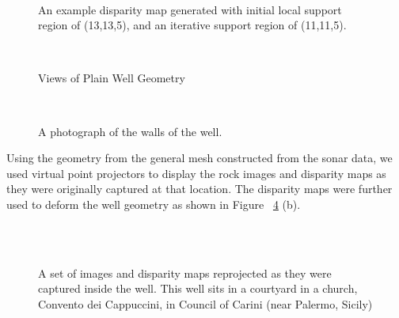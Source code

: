 \documentclass[a4paper,twoside]{article}
\begin{document}
\begin{figure}[!h]
	\centering
		\quad %
		\\%
		\medskip
		\caption{An example disparity map generated with initial local support region of (13,13,5), and an iterative support region of (11,11,5).}
		\label{fig:disparity}
\end{figure}


\begin{figure}[!h]
	\centering
		\quad %
		\\%

		\caption{Views of Plain Well Geometry}
		\label{fig:wellNoFine}
\end{figure}

\begin{figure}[!h]
	\centering
		\\%

		\caption{ A photograph of the walls of the well.}
		\label{fig:wellPhoto}
\end{figure}

Using the geometry from the general mesh constructed from the sonar data, we used virtual point projectors to display the rock images and disparity maps as they were originally captured at that location.  
The disparity maps were further used to deform the well geometry as shown in Figure ~\ref{fig:result2} (b).

\begin{figure}[!h]
	\centering
		\\
		\quad %
			\\		
	
		\caption{A set of images and disparity maps reprojected as they were captured inside the well. This well sits in a courtyard in a church, Convento dei Cappuccini, in Council of Carini (near Palermo, Sicily)}
		\label{fig:result2}
\end{figure}
\end{document}
